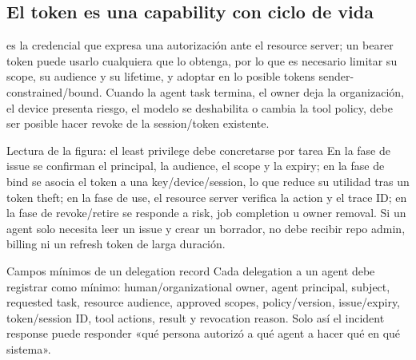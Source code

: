 
\subsection{El token es una capability con ciclo de vida}

 es la credencial que expresa una autorización ante el resource server; un bearer token puede usarlo cualquiera que lo obtenga, por lo que es necesario limitar su scope, su audience y su lifetime, y adoptar en lo posible tokens sender-constrained/bound. Cuando la agent task termina, el owner deja la organización, el device presenta riesgo, el modelo se deshabilita o cambia la tool policy, debe ser posible hacer revoke de la session/token existente.


\begin{knowledgebox}{Lectura de la figura: el least privilege debe concretarse por tarea}
En la fase de issue se confirman el principal, la audience, el scope y la expiry; en la fase de bind se asocia el token a una key/device/session, lo que reduce su utilidad tras un token theft; en la fase de use, el resource server verifica la action y el trace ID; en la fase de revoke/retire se responde a risk, job completion u owner removal. Si un agent solo necesita leer un issue y crear un borrador, no debe recibir repo admin, billing ni un refresh token de larga duración.
\end{knowledgebox}

\begin{importantbox}{Campos mínimos de un delegation record}
Cada delegation a un agent debe registrar como mínimo: human/organizational owner, agent principal, subject, requested task, resource audience, approved scopes, policy/version, issue/expiry, token/session ID, tool actions, result y revocation reason. Solo así el incident response puede responder «qué persona autorizó a qué agent a hacer qué en qué sistema».
\end{importantbox}


